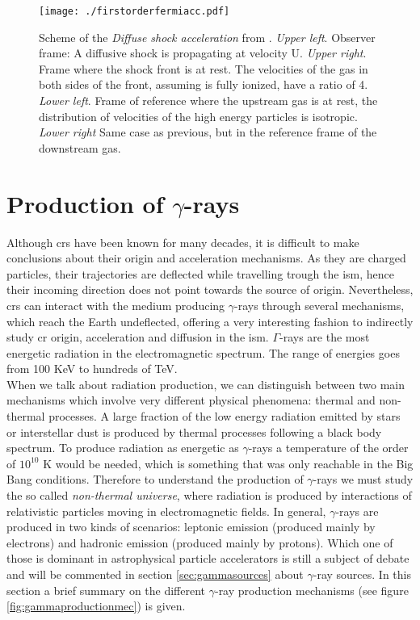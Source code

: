 \documentclass[main.tex]{subfiles}
\begin{document}
\begin{figure}
\centering
 \texttt{[image: ./firstorderfermiacc.pdf]}
  \caption{Scheme of the \textit{Diffuse shock acceleration} from \cite{highenergyastrophy}. \textit{Upper left}. Observer frame: A diffusive shock is propagating at velocity U. \textit{Upper right}. Frame where the shock front is at rest. The velocities of the gas in both sides of the front, assuming is fully ionized, have a ratio of 4. \textit{Lower left}. Frame of reference where the upstream gas is at rest, the distribution of velocities of the high energy particles is isotropic. \textit{Lower right} Same case as previous, but in the reference frame of the downstream gas.}
    \label{fig:shock}
\end{figure}

\section{Production of $\gamma$-rays}\label{sec:gammaproduction}

Although \glspl{cr} have been known for many decades, it is difficult to make conclusions about their origin and acceleration mechanisms. As they are charged particles, their trajectories are deflected while travelling trough the \gls{ism}, hence their incoming direction does not point towards the source of origin. Nevertheless, \glspl{cr} can interact with the medium producing $\gamma$-rays through several mechanisms, which reach the Earth undeflected, offering a very interesting fashion to indirectly study \gls{cr} origin, acceleration and diffusion in the \gls{ism}.  
$\Gamma$-rays are the most energetic radiation in the electromagnetic spectrum. The range of energies goes from 100 KeV to hundreds of TeV.\\
When we talk about radiation production, we can distinguish between two main mechanisms which involve very different physical phenomena: thermal and non-thermal processes. A large fraction of the low energy radiation emitted by stars or interstellar dust is produced by thermal processes following a black body spectrum. To produce radiation as energetic as $\gamma$-rays a temperature of the order of $10^{10}$ K would be needed, which is something that was only reachable in the Big Bang conditions. Therefore to understand the production of $\gamma$-rays we must study the so called \textit{non-thermal universe}, where radiation is produced by interactions of relativistic particles moving in electromagnetic fields.
In general, $\gamma$-rays are produced in two kinds of scenarios: leptonic emission (produced mainly by electrons) and hadronic emission (produced mainly by protons). Which one of those is dominant in astrophysical particle accelerators is still a subject of debate and will be commented in section \ref{sec:gammasources} about $\gamma$-ray sources.
In this section a brief summary on the different $\gamma$-ray production mechanisms (see figure \ref{fig:gammaproductionmec}) is given.
\end{document}
